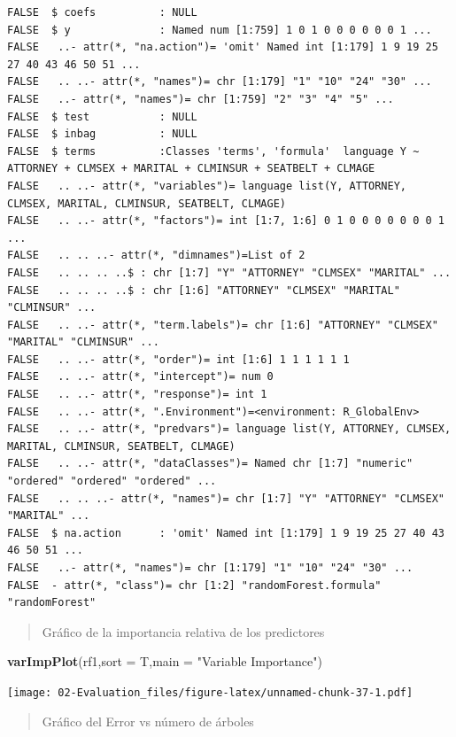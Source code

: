 \documentclass[]{book}
\newenvironment{Shaded}{\begin{snugshade}}{\end{snugshade}}
\newcommand{\DataTypeTok}[1]{\textcolor[rgb]{0.13,0.29,0.53}{#1}}
\newcommand{\KeywordTok}[1]{\textcolor[rgb]{0.13,0.29,0.53}{\textbf{#1}}}
\newcommand{\NormalTok}[1]{#1}
\newcommand{\StringTok}[1]{\textcolor[rgb]{0.31,0.60,0.02}{#1}}
\begin{document}
\begin{verbatim}
FALSE  $ coefs          : NULL
FALSE  $ y              : Named num [1:759] 1 0 1 0 0 0 0 0 0 1 ...
FALSE   ..- attr(*, "na.action")= 'omit' Named int [1:179] 1 9 19 25 27 40 43 46 50 51 ...
FALSE   .. ..- attr(*, "names")= chr [1:179] "1" "10" "24" "30" ...
FALSE   ..- attr(*, "names")= chr [1:759] "2" "3" "4" "5" ...
FALSE  $ test           : NULL
FALSE  $ inbag          : NULL
FALSE  $ terms          :Classes 'terms', 'formula'  language Y ~ ATTORNEY + CLMSEX + MARITAL + CLMINSUR + SEATBELT + CLMAGE
FALSE   .. ..- attr(*, "variables")= language list(Y, ATTORNEY, CLMSEX, MARITAL, CLMINSUR, SEATBELT, CLMAGE)
FALSE   .. ..- attr(*, "factors")= int [1:7, 1:6] 0 1 0 0 0 0 0 0 0 1 ...
FALSE   .. .. ..- attr(*, "dimnames")=List of 2
FALSE   .. .. .. ..$ : chr [1:7] "Y" "ATTORNEY" "CLMSEX" "MARITAL" ...
FALSE   .. .. .. ..$ : chr [1:6] "ATTORNEY" "CLMSEX" "MARITAL" "CLMINSUR" ...
FALSE   .. ..- attr(*, "term.labels")= chr [1:6] "ATTORNEY" "CLMSEX" "MARITAL" "CLMINSUR" ...
FALSE   .. ..- attr(*, "order")= int [1:6] 1 1 1 1 1 1
FALSE   .. ..- attr(*, "intercept")= num 0
FALSE   .. ..- attr(*, "response")= int 1
FALSE   .. ..- attr(*, ".Environment")=<environment: R_GlobalEnv> 
FALSE   .. ..- attr(*, "predvars")= language list(Y, ATTORNEY, CLMSEX, MARITAL, CLMINSUR, SEATBELT, CLMAGE)
FALSE   .. ..- attr(*, "dataClasses")= Named chr [1:7] "numeric" "ordered" "ordered" "ordered" ...
FALSE   .. .. ..- attr(*, "names")= chr [1:7] "Y" "ATTORNEY" "CLMSEX" "MARITAL" ...
FALSE  $ na.action      : 'omit' Named int [1:179] 1 9 19 25 27 40 43 46 50 51 ...
FALSE   ..- attr(*, "names")= chr [1:179] "1" "10" "24" "30" ...
FALSE  - attr(*, "class")= chr [1:2] "randomForest.formula" "randomForest"
\end{verbatim}

\begin{quote}
Gráfico de la importancia relativa de los predictores
\end{quote}

\begin{Shaded}
\begin{Highlighting}[]
  \KeywordTok{varImpPlot}\NormalTok{(rf1,}\DataTypeTok{sort =}\NormalTok{ T,}\DataTypeTok{main =} \StringTok{"Variable Importance"}\NormalTok{)}
\end{Highlighting}
\end{Shaded}

\texttt{[image: 02-Evaluation\_files/figure-latex/unnamed-chunk-37-1.pdf]}

\begin{quote}
Gráfico del Error vs número de árboles
\end{quote}
\end{document}
